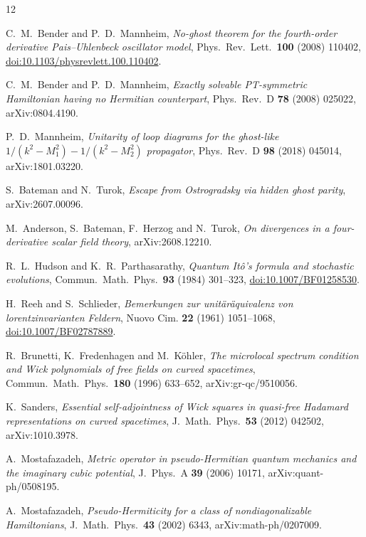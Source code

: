\documentclass[11pt]{article}
\theoremstyle{definition}
\theoremstyle{remark}
\begin{document}
\begin{thebibliography}{12}

C.~M.~Bender and P.~D.~Mannheim,
\emph{No-ghost theorem for the fourth-order derivative Pais--Uhlenbeck
oscillator model},
Phys.\ Rev.\ Lett.\ \textbf{100} (2008) 110402,
\href{https://doi.org/10.1103/physrevlett.100.110402}{doi:10.1103/physrevlett.100.110402}.

C.~M.~Bender and P.~D.~Mannheim,
\emph{Exactly solvable PT-symmetric Hamiltonian having no Hermitian
counterpart},
Phys.\ Rev.\ D \textbf{78} (2008) 025022, arXiv:0804.4190.

P.~D.~Mannheim,
\emph{Unitarity of loop diagrams for the ghost-like
$1/(k^2-M_1^2)-1/(k^2-M_2^2)$ propagator},
Phys.\ Rev.\ D \textbf{98} (2018) 045014, arXiv:1801.03220.

S.~Bateman and N.~Turok,
\emph{Escape from Ostrogradsky via hidden ghost parity},
arXiv:2607.00096.

M.~Anderson, S.~Bateman, F.~Herzog and N.~Turok,
\emph{On divergences in a four-derivative scalar field theory},
arXiv:2608.12210.

R.~L.~Hudson and K.~R.~Parthasarathy,
\emph{Quantum It\^o's formula and stochastic evolutions},
Commun.\ Math.\ Phys.\ \textbf{93} (1984) 301--323,
\href{https://doi.org/10.1007/BF01258530}{doi:10.1007/BF01258530}.

H.~Reeh and S.~Schlieder,
\emph{Bemerkungen zur unit\"ar\"aquivalenz von lorentzinvarianten Feldern},
Nuovo Cim. \textbf{22} (1961) 1051--1068,
\href{https://doi.org/10.1007/BF02787889}{doi:10.1007/BF02787889}.

R.~Brunetti, K.~Fredenhagen and M.~K\"ohler,
\emph{The microlocal spectrum condition and Wick polynomials of free fields
on curved spacetimes},
Commun.\ Math.\ Phys.\ \textbf{180} (1996) 633--652,
arXiv:gr-qc/9510056.

K.~Sanders,
\emph{Essential self-adjointness of Wick squares in quasi-free Hadamard
representations on curved spacetimes},
J.\ Math.\ Phys.\ \textbf{53} (2012) 042502,
arXiv:1010.3978.

A.~Mostafazadeh,
\emph{Metric operator in pseudo-Hermitian quantum mechanics and the
imaginary cubic potential},
J.\ Phys.\ A \textbf{39} (2006) 10171, arXiv:quant-ph/0508195.

A.~Mostafazadeh,
\emph{Pseudo-Hermiticity for a class of nondiagonalizable
Hamiltonians},
J.\ Math.\ Phys.\ \textbf{43} (2002) 6343, arXiv:math-ph/0207009.


\end{thebibliography}
\end{document}
